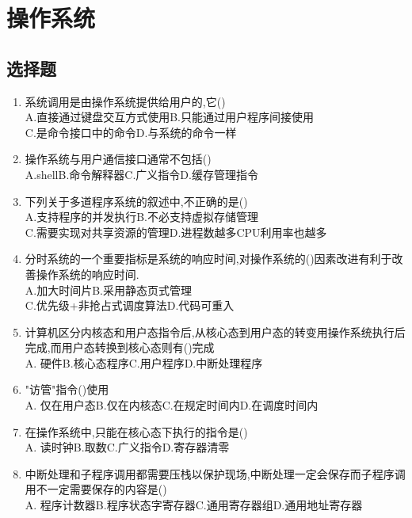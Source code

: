 \documentclass[12pt, a4paper, oneside, UTF8]{ctexbook}
\begin{document}
% 
\else
\fi
\chapter{操作系统}
\section{选择题}
\begin{enumerate}
    \item 系统调用是由操作系统提供给用户的,它() \\
    A.直接通过键盘交互方式使用\qquad B.只能通过用户程序间接使用 \\
    C.是命令接口中的命令\qquad D.与系统的命令一样
    
    \item 操作系统与用户通信接口通常不包括() \\
    A.shell\qquad B.命令解释器\qquad C.广义指令\qquad D.缓存管理指令 

    \item 下列关于多道程序系统的叙述中,不正确的是() \\
    A.支持程序的并发执行\qquad B.不必支持虚拟存储管理 \\
    C.需要实现对共享资源的管理\qquad D.进程数越多CPU利用率也越多 

    \item 分时系统的一个重要指标是系统的响应时间,对操作系统的()因素改进有利于改善操作系统的响应时间. \\
    A.加大时间片\qquad B.采用静态页式管理 \\
    C.优先级+非抢占式调度算法\qquad D.代码可重入 

    \item 计算机区分内核态和用户态指令后,从核心态到用户态的转变用操作系统执行后完成,而用户态转换到核心态则有()完成 \\
    A. 硬件\qquad B.核心态程序\qquad C.用户程序\qquad D.中断处理程序

    \item "访管"指令()使用 \\
    A. 仅在用户态\qquad B.仅在内核态\qquad C.在规定时间内\qquad D.在调度时间内

    \item 在操作系统中,只能在核心态下执行的指令是() \\
    A. 读时钟\qquad B.取数\qquad C.广义指令\qquad D.寄存器清零

    \item \bt\bl 中断处理和子程序调用都需要压栈以保护现场,中断处理一定会保存而子程序调用不一定需要保存的内容是() \\
    A. 程序计数器\qquad B.程序状态字寄存器\qquad C.通用寄存器组\qquad D.通用地址寄存器


\end{enumerate}
\end{document}
